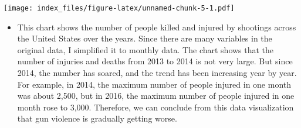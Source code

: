 \documentclass[
]{article}
\providecommand{\tightlist}{%
  \setlength{\itemsep}{0pt}\setlength{\parskip}{0pt}}
\begin{document}
\texttt{[image: index\_files/figure-latex/unnamed-chunk-5-1.pdf]}

\begin{itemize}
\tightlist
\item
  This chart shows the number of people killed and injured by shootings
  across the United States over the years. Since there are many
  variables in the original data, I simplified it to monthly data. The
  chart shows that the number of injuries and deaths from 2013 to 2014
  is not very large. But since 2014, the number has soared, and the
  trend has been increasing year by year. For example, in 2014, the
  maximum number of people injured in one month was about 2,500, but in
  2016, the maximum number of people injured in one month rose to 3,000.
  Therefore, we can conclude from this data visualization that gun
  violence is gradually getting worse.
\end{itemize}
\end{document}
